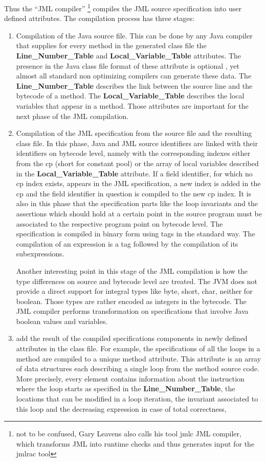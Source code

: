 Thus the ``JML compiler'' \footnote{not to be confused, Gary Leavens also calls his tool jmlc JML compiler, which transforms JML into runtime checks and thus generates input for the jmlrac tool  } compiles the JML source specification into user defined attributes. The compilation process has three stages:
\begin{enumerate}
\item Compilation of the Java source file. This can be done by any Java compiler that supplies for every method in the generated class file 
the \textbf{Line\_Number\_Table} and \textbf{Local\_Variable\_Table}  attributes. The presence in the Java class file format of 
these attribute is optional \cite{VMSpec}, yet almost all standard non optimizing compilers can generate these data. 
The \textbf{Line\_Number\_Table} describes the link between the source line and the bytecode of a method.  
The \textbf{Local\_Variable\_Table} describes the local variables that appear in a method. 
Those attributes are important for the next phase of the JML compilation.
\item Compilation of the JML specification from the source file and the resulting class file. In this phase, Java and JML source identifiers are 
linked with their identifiers on bytecode level, namely with the corresponding indexes either from the cp (short for constant pool) or the array of 
local variables described in the \textbf{Local\_Variable\_Table} attribute. If a field
identifier, for which no cp index exists, appears in the JML specification, a new index is added in the cp and the field identifier in question
is compiled to the new cp index. It is also in this phase that the specification parts like the loop invariants and the assertions which should hold at a certain point in the source program must be associated to the respective program point on bytecode level. The specification
is compiled in binary form using tags in the standard way. The compilation of an expression is a tag followed by the compilation of its subexpressions. 

Another interesting point in this stage of the JML compilation is how the type differences on source and bytecode level are treated. 
The JVM does not provide a direct support for integral types like byte, short, char, neither for boolean.
 Those types are rather encoded as integers in the bytecode. The JML compiler performs transformation on specifications that involve Java boolean values and variables.

\item add the result of the compiled specifications components in
newly defined attributes in the class file.
 For example, the specifications of all the loops in a method are compiled to a unique method attribute.%
This attribute is an array of data structures each describing a single loop from the method source code. 
More precisely, every element contains information about the instruction where the loop starts as specified in the
\textbf{Line\_Number\_Table}, the locations that can be modified in a loop iteration, 
 the invariant associated to this loop and the decreasing expression in case of total correctness, 


\end{enumerate}
